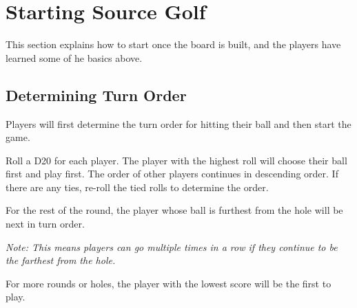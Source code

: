 \documentclass[../main.tex]{subfiles}
\begin{document}
\section{Starting Source Golf}
This section explains how to start once the board is built, and the players have learned some of he basics above. 

\subsection{Determining Turn Order}
Players will first determine the turn order for hitting their ball and then start the game. 

Roll a D20 for each player. The player with the highest roll will choose their ball first and play first. The order of other players continues in descending order. If there are any ties, re-roll the tied rolls to determine the order. 

For the rest of the round, the player whose ball is furthest from the hole will be next in turn order. 

\textit{Note: This means players can go multiple times in a row if they continue to be the farthest from the hole.} 

For more rounds or holes, the player with the lowest score will be the first to play. 
\end{document}
